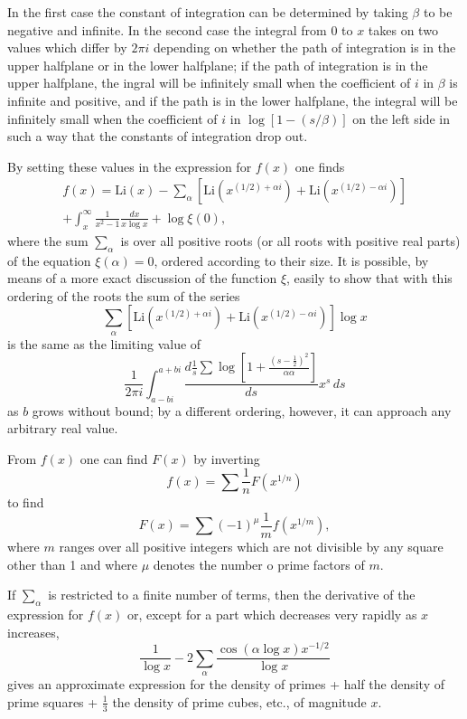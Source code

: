 In the first case the constant of integration can be determined by taking
$\beta$ to be negative and infinite. In the second case the integral from
0 to $x$ takes on two values which differ by $2\pi i$ depending on whether
the path of integration is in the upper halfplane or in the lower halfplane;
if the path of integration is in the upper halfplane, the ingral will be
infinitely small when the coefficient of $i$ in $\beta$ is infinite and positive,
and if the path is in the lower halfplane, the integral will be infinitely
small when the coefficient of $i$ in $\log[1 - (s/\beta)]$ on the left side
in such a way that the constants of integration drop out.

By setting these values in the expression for $f(x)$ one finds
%
\begin{align*}
    f(x) = \text{Li}(x) - 
    \sum_{\alpha} 
    [\text{Li}(x^{(1/2) + \alpha i}) + \text{Li}(x^{(1/2) - \alpha i})] \\
    + \int_x^{\infty} \frac{1}{x^2 - 1}\frac{dx}{x\log x} + \log\xi(0),
\end{align*}
%
where the sum $\sum_{\alpha}$ is over all positive roots (or all roots with
positive real parts) of the equation $\xi(\alpha) = 0$, ordered according
to their size. It is possible, by means of a more exact discussion of the
function $\xi$, easily to show that with this ordering of the roots the sum
of the series
%
\[
\sum_{\alpha} 
[\text{Li}(x^{(1/2) + \alpha i}) + \text{Li}(x^{(1/2) - \alpha i})]\log x
\]
%
is the same as the limiting value of
%
\[
\frac{1}{2\pi i}\int_{a-bi}^{a+bi} 
\frac{d\frac{1}{s}\sum\log\left[1 + \frac{(s - \frac{1}{2})^2}{\alpha\alpha}\right]}{ds} x^s \, ds
\]
%
as $b$ grows without bound; by a different ordering, however, it can approach
any arbitrary real value.

From $f(x)$ one can find $F(x)$ by inverting
%
\[
f(x) = \sum \frac{1}{n}F(x^{1/n})
\]
%
to find
%
\[
F(x) = \sum (-1)^{\mu} \frac{1}{m} f(x^{1/m}),
\]
%
where $m$ ranges over all positive integers which are not divisible by any square
other than 1 and where $\mu$ denotes the number o prime factors of $m$.

If $\sum_{\alpha}$ is restricted to a finite number of terms, then the derivative
of the expression for $f(x)$ or, except for a part which decreases very rapidly
as $x$ increases,
%
\[
\frac{1}{\log x} - 2\sum_{\alpha}\frac{\cos(\alpha\log x)x^{-1/2}}{\log x}
\]
%
gives an approximate expression for the density of primes + half the density of
prime squares + $\frac{1}{3}$ the density of prime cubes, etc., of magnitude $x$.

